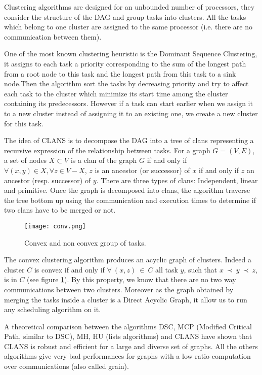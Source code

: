 \documentclass[10pt, conference, compsocconf]{IEEEtran}
\begin{document}
Clustering algorithms are designed for an unbounded number of processors, they
consider the structure of the DAG and group tasks into clusters. All the
tasks which belong to one cluster are assigned to the same processor (i.e. 
there are no communication between them).  

One of the most known clustering heuristic is the Dominant Sequence
Clustering\cite{yang1994dsc}, it assigns to each task a priority corresponding
to the sum of the longest path from a root node to this task and the longest
path from this task to a sink node.Then the algorithm sort the tasks by
decreasing priority and try to affect each task to the cluster which minimize
its start time among the cluster containing its predecessors. However if a
task can start earlier when we assign it to a new cluster instead of assigning
it to an existing one, we create a new cluster for this task.

The idea of CLANS
\cite{aubum1990efficient,mccreary1993partitioning,mccreary1993graph} is to
decompose the DAG into a tree of clans representing a recursive expression of
the relationship between tasks. For a graph $G=(V,E)$, a set of nodes
$X\subset V$ is a clan of the graph $G$ if and only if $\forall (x,y) \in X,
\forall z \in V-X$, $z$ is an ancestor (or successor) of $x$ if and only if
$z$ an ancestor (resp. successor) of $y$. There are three types of clans:
Independent, linear and primitive. Once the graph is decomposed into clans,
the algorithm traverse the tree bottom up using the communication and
execution times to determine if two clans have to be merged or not.

\begin{figure}[htb]
    \centering
    \texttt{[image: conv.png]}
    \caption{Convex and non convex group of tasks.}
    \label{fig:conv}
\end{figure}


The convex clustering algorithm\cite{lepere2002new} produces an acyclic graph
of clusters.  Indeed a cluster $C$ is convex if and only if $\forall\ (x,z)\
\in\ C$ all task $y$, such that $x\ \prec\ y\ \prec\ z$, is in $C$ (see
figure \ref{fig:conv}). By this property, we know that there are no two way
communications between two clusters. Moreover as the graph obtained by merging
the tasks inside a cluster is a Direct Acyclic Graph, it allow us to run
any scheduling algorithm on it.

A theoretical comparison\cite{khan1994comparison} between the algorithms DSC,
MCP (Modified Critical Path, similar to DSC), MH, HU (lists algorithms) and
CLANS have shown that CLANS is robust and efficient for a large and diverse
set of graphs. All the others algorithms give very bad performances for graphs
with a low ratio computation over communications (also called grain).
\end{document}
